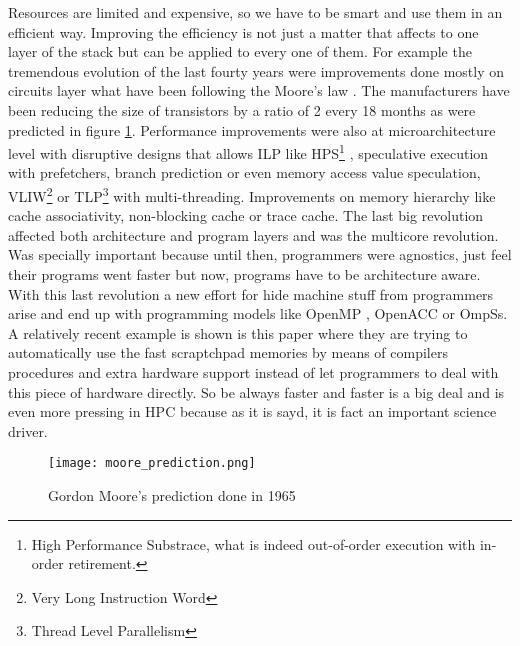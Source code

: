 Resources are limited and expensive, so we have to be smart and use them in an
efficient way. Improving the efficiency is not just a matter that affects to one
layer of the stack but can be applied to every one of them. For example the
tremendous evolution of the last fourty years were improvements done mostly on
circuits layer what have been following the Moore's law \cite{moore:1965}. The
manufacturers have been reducing the size of transistors by a ratio of 2 every
18 months as were predicted in figure \ref{moore-prediction}. Performance improvements 
were also at microarchitecture level with
disruptive designs that allows ILP like HPS\footnote{High Performance Substrace,
what is indeed out-of-order execution with in-order retirement.}
\cite{Patt:1985:HNM:18927.18916}, speculative execution with prefetchers, 
branch prediction or even memory access value speculation,
VLIW\footnote{Very Long Instruction Word} or TLP\footnote{Thread Level
Parallelism} with multi-threading. Improvements on memory hierarchy like cache 
associativity, non-blocking cache or trace cache. The last
big revolution affected both architecture and program layers and was the 
multicore revolution. Was specially important because until then, programmers were 
agnostics, just feel their programs went faster but now, programs have to be 
architecture aware. With this last revolution a new effort for hide machine stuff
from programmers arise and end up with programming models like OpenMP
\cite{openmp_new}, OpenACC\cite{openacc_new} or OmpSs\cite{ompss_new}. A relatively
recent example is shown is this paper \cite{Alvarez:2015:CPT:2872887.2750411}
where they are trying to automatically use the fast scraptchpad memories by
means of compilers procedures and extra hardware support instead
of let programmers to deal with this piece of hardware directly. So be 
always faster and faster is a big deal and is even more pressing in HPC because 
as it is sayd, it is fact an important science driver.

\begin{figure}
  \caption{Gordon Moore's prediction done in 1965}
  \label{moore-prediction}
  \centering
    \texttt{[image: moore\_prediction.png]}
\end{figure}


